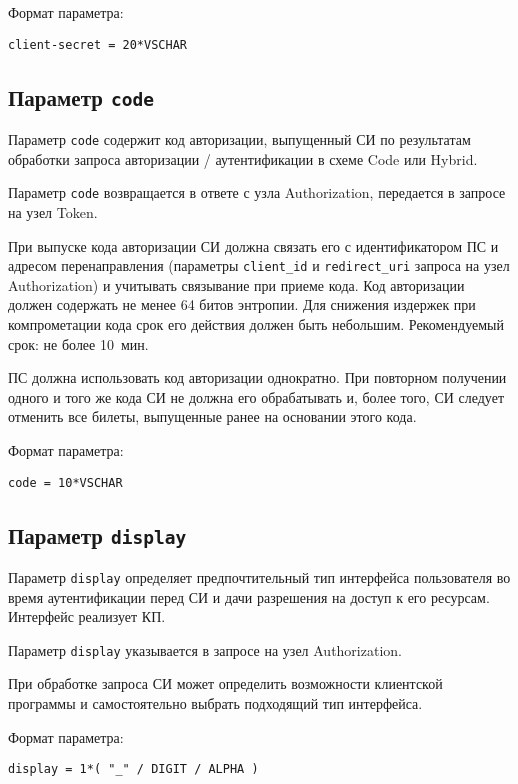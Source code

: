 Формат параметра:
\begin{lstlisting}
client-secret = 20*VSCHAR
\end{lstlisting}

\subsection{Параметр \lstinline{code}}\label{PARAMS.Code}

Параметр \lstinline{code} содержит код авторизации, выпущенный СИ
по результатам обработки запроса авторизации / аутентификации в схеме
Code или Hybrid.

Параметр \lstinline{code} возвращается в ответе с узла Authorization, 
передается в запросе на узел Token.

При выпуске кода авторизации СИ должна связать его с идентификатором ПС 
и адресом перенаправления (параметры \lstinline{client_id} и 
\lstinline{redirect_uri} запроса на узел Authorization) и учитывать 
связывание при приеме кода.
%
Код авторизации должен содержать не менее 64 битов энтропии.
%
Для снижения издержек при компрометации кода срок его действия должен быть 
небольшим.
%
Рекомендуемый срок: не более 10~мин.

ПС должна использовать код авторизации однократно. При повторном получении 
одного и того же кода СИ не должна его обрабатывать и, более того, СИ следует   
отменить все билеты, выпущенные ранее на основании этого кода.

Формат параметра:
\begin{lstlisting}
code = 10*VSCHAR
\end{lstlisting}

\subsection{Параметр \lstinline{display}}\label{PARAMS.Display}  

Параметр \lstinline{display} определяет предпочтительный тип интерфейса 
пользователя во время аутентификации перед СИ и дачи разрешения на доступ к его 
ресурсам. Интерфейс реализует КП.

Параметр \lstinline{display} указывается в запросе на узел Authorization.

При обработке запроса СИ может определить возможности клиентской программы и 
самостоятельно выбрать подходящий тип интерфейса.

Формат параметра:
\begin{lstlisting}
display = 1*( "_" / DIGIT / ALPHA )
\end{lstlisting}

